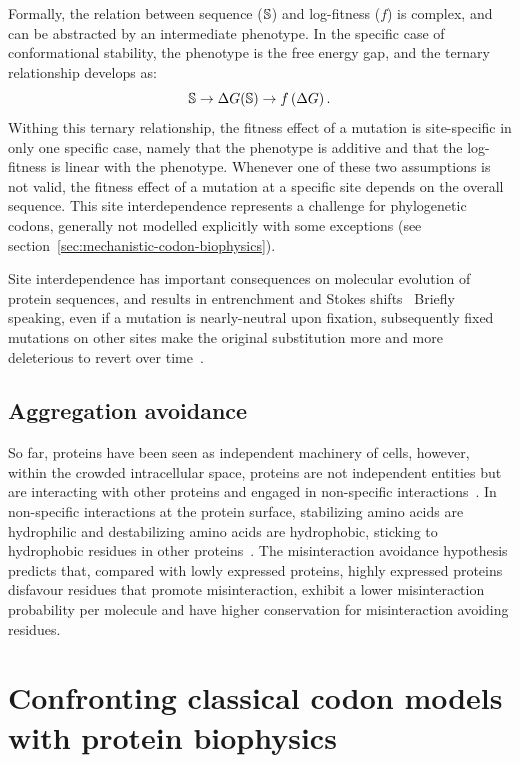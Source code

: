 Formally, the relation between sequence ($\mathbb{S}$) and log-fitness ($f$) is complex, and can be abstracted by an intermediate \gls{phenotype}.
In the specific case of conformational stability, the \gls{phenotype} is the free energy gap, and the ternary relationship develops as:
\begin{equation}
    \mathbb{S} \rightarrow \Delta G (\mathbb{S}) \rightarrow f \left( \Delta G \right).
\end{equation}
Withing this ternary relationship, the fitness effect of a mutation is site-specific in only one specific case, namely that the \gls{phenotype} is additive and that the log-fitness is linear with the \gls{phenotype}.
Whenever one of these two assumptions is not valid, the fitness effect of a mutation at a specific site depends on the overall sequence.
This site interdependence represents a challenge for phylogenetic \glspl{codon}, generally not modelled explicitly with some exceptions (see section~\ref{sec:mechanistic-codon-biophysics}).

Site interdependence has important consequences on molecular evolution  of protein sequences, and results in entrenchment and Stokes shifts~\citep{Pollock2012, Shah2015}
Briefly speaking, even if a mutation is \gls{nearly-neutral} upon fixation, subsequently fixed mutations on other sites make the original \gls{substitution} more and more deleterious to revert over time~\citep{Lunzer2010, Naumenko2012, Mccandlish2013}.

\subsection{Aggregation avoidance}

So far, proteins have been seen as independent machinery of cells, however, within the crowded intracellular space, proteins are not independent entities but are interacting with other proteins and engaged in non-specific interactions~\citep{Yang2012, Zhang2013}.
In non-specific interactions at the protein surface, stabilizing amino acids are hydrophilic and destabilizing amino acids are hydrophobic, sticking to hydrophobic residues in other proteins~\citep{Dixit2013,Manhart2015}.
The misinteraction avoidance hypothesis predicts that, compared with lowly expressed proteins, highly expressed proteins disfavour residues that promote misinteraction, exhibit a lower misinteraction probability per molecule and have higher conservation for misinteraction avoiding residues.

\section{Confronting classical codon models with protein biophysics}
\label{sec:classical-codon-biophysics}


